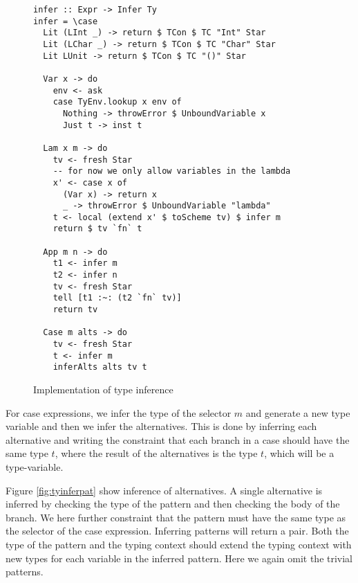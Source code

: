 \documentclass[a4paper, openany]{article}
\begin{document}
\begin{figure}[h!]
\begin{lstlisting}
infer :: Expr -> Infer Ty
infer = \case
  Lit (LInt _) -> return $ TCon $ TC "Int" Star
  Lit (LChar _) -> return $ TCon $ TC "Char" Star
  Lit LUnit -> return $ TCon $ TC "()" Star

  Var x -> do
    env <- ask
    case TyEnv.lookup x env of
      Nothing -> throwError $ UnboundVariable x
      Just t -> inst t

  Lam x m -> do
    tv <- fresh Star
    -- for now we only allow variables in the lambda
    x' <- case x of
      (Var x) -> return x
      _ -> throwError $ UnboundVariable "lambda"
    t <- local (extend x' $ toScheme tv) $ infer m
    return $ tv `fn` t

  App m n -> do
    t1 <- infer m
    t2 <- infer n
    tv <- fresh Star
    tell [t1 :~: (t2 `fn` tv)]
    return tv

  Case m alts -> do
    tv <- fresh Star
    t <- infer m
    inferAlts alts tv t
\end{lstlisting}
\caption{Implementation of type inference}
\label{fig:tyinfer}
\end{figure}

For case expressions, we infer the type of the selector \(m\) and generate a new type variable and then we infer the alternatives.
This is done by inferring each alternative and writing the constraint that each branch in a case should have the same type \(t\),
where the result of the alternatives is the type \(t\), which will be a type-variable.

Figure \ref{fig:tyinferpat} show inference of alternatives. A single alternative is inferred by checking the type of the pattern and then checking the body of the branch. We here further constraint that the pattern must have the same type as the selector of the case expression.
Inferring patterns will return a pair. Both the type of the pattern and the typing context should extend the typing context with new types for each variable in the inferred pattern.
Here we again omit the trivial patterns.
\end{document}
